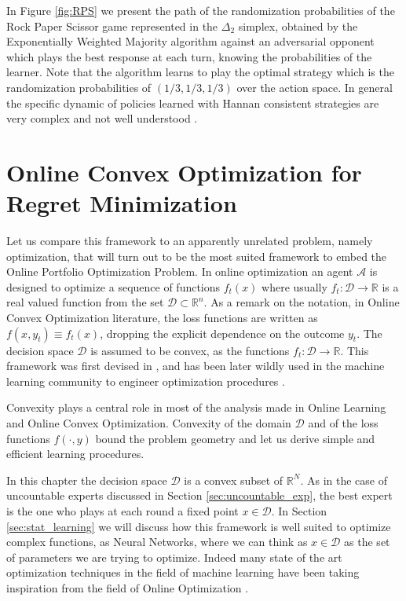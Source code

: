 In Figure \ref{fig:RPS} we present the path of the randomization probabilities of the Rock Paper Scissor game represented in the $\Delta_{2}$ simplex, obtained by the Exponentially Weighted Majority algorithm against an adversarial opponent which plays the best response at each turn, knowing the probabilities of the learner.
Note that the algorithm learns to play the optimal strategy which is the randomization probabilities of $(1/3,1/3,1/3)$ over the action space. 
In general the specific dynamic of policies learned with Hannan consistent strategies are very complex and not well understood \cite{bailey2018multiplicative}.

\section{Online Convex Optimization for Regret Minimization}\label{sec:OCO}

Let us compare this framework to an apparently unrelated problem, namely optimization, that will turn out to be the most suited framework to embed the Online Portfolio Optimization Problem. In online optimization an agent $\mathcal A$ is designed to optimize a sequence of functions $f_t(x)$ where usually $f_t:\mathcal D\to \mathbb R$ is a real valued function from the set $\mathcal D\subset\mathbb R^n$. As a remark on the notation, in Online Convex Optimization literature, the loss functions are written as $f(x,y_t)\equiv f_t(x)$, dropping the explicit dependence on the outcome $y_t$.
The decision space $\mathcal D$ is assumed to be convex, as the functions $f_t:\mathcal D\to \mathbb R$. This framework was first devised in \cite{zinkevich2003online}, and has been later wildly used in the machine learning community to engineer optimization procedures \cite{shalev2012online}. 

Convexity plays a central role in most of the analysis made in Online Learning and Online Convex Optimization. Convexity of the domain $\mathcal D$ and of the loss functions $f(\cdot,y)$ bound the problem geometry and let us derive simple and efficient learning procedures.

In this chapter the decision space $\mathcal D$ is a convex subset of $\mathbb R^N$. As in the case of uncountable experts discussed in Section \ref{sec:uncountable_exp}, the best expert is the one who plays at each round a fixed point $x\in\mathcal D$. In Section \ref{sec:stat_learning} we will discuss how this framework is well suited to optimize complex functions, as Neural Networks, where we can think as $x\in\mathcal D$ as the set of parameters we are trying to optimize. Indeed many state of the art optimization techniques in the field of machine learning have been taking inspiration from the field of Online Optimization \cite{duchi2011adaptive}.

